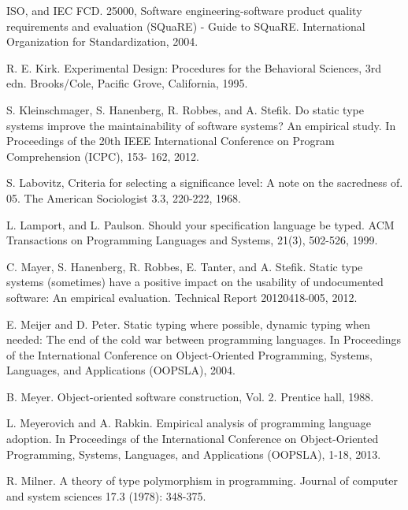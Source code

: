 \documentclass[msc]{ppgccufmg}
\begin{document}
\begin{thebibliography}{}
ISO, and IEC FCD. 25000, Software engineering-software product quality requirements and evaluation (SQuaRE) - Guide to SQuaRE. International Organization for Standardization, 2004.

R. E. Kirk. Experimental Design: Procedures for the Behavioral Sciences, 3rd edn. Brooks/Cole, Pacific Grove, California, 1995.

S. Kleinschmager, S. Hanenberg, R. Robbes, and A. Stefik. Do static type systems improve the maintainability of software systems? An empirical study. In Proceedings of the 20th IEEE International Conference on Program Comprehension (ICPC), 153- 162, 2012.

S. Labovitz, Criteria for selecting a significance level: A note on the sacredness of. 05. The American Sociologist 3.3, 220-222, 1968.

L. Lamport, and L. Paulson. Should your specification language be typed. ACM Transactions on Programming Languages and Systems, 21(3), 502-526, 1999.

C. Mayer, S. Hanenberg, R. Robbes, E. Tanter, and A. Stefik. Static type systems (sometimes) have a positive impact on the usability of undocumented software: An empirical evaluation.  Technical Report 20120418-005, 2012.

E. Meijer and D. Peter. Static typing where possible, dynamic typing when needed: The end of the cold war between programming languages. In Proceedings of the International Conference on Object-Oriented Programming, Systems, Languages, and Applications (OOPSLA), 2004.

B. Meyer. Object-oriented software construction, Vol. 2. Prentice hall, 1988.

L. Meyerovich and A. Rabkin. Empirical analysis of programming language adoption. In Proceedings of the International Conference on Object-Oriented Programming, Systems, Languages, and Applications (OOPSLA), 1-18, 2013.

R. Milner. A theory of type polymorphism in programming. Journal of computer and system sciences 17.3 (1978): 348-375.


\end{thebibliography}
\end{document}
